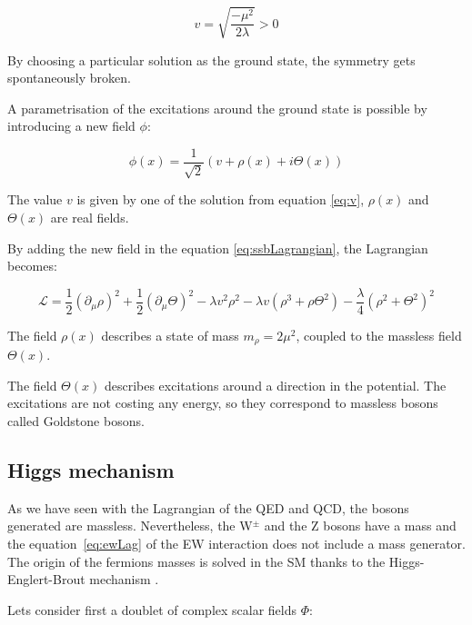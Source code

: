     \begin{equation}
      v = \sqrt{\frac{- \mu^2}{2\lambda}} > 0
      \label{eq:v}
    \end{equation}

    By choosing a particular solution as the ground state, the symmetry gets spontaneously broken.

    A parametrisation of the excitations around the ground state is possible by introducing a new field $\phi$:

    \begin{equation}
      \phi(x) = \frac{1}{\sqrt{2}} \left( v + \rho(x) + i\Theta(x) \right)
    \end{equation}

    The value $v$ is given by one of the solution from equation \ref{eq:v}, $\rho(x)$ and $\Theta(x)$ are real fields.

    By adding the new field in the equation \ref{eq:ssbLagrangian}, the Lagrangian becomes:

    \begin{equation}
      \mathcal{L} = \frac{1}{2} (\partial_{\mu}\rho)^2 + \frac{1}{2}(\partial_{\mu}\Theta)^2 - \lambda v^2 \rho^2 - \lambda v (\rho^3 +\rho \Theta^2) - \frac{\lambda}{4}(\rho^2 + \Theta^2)^2
    \end{equation}

    The field $\rho(x)$ describes a state of mass $m_{\rho} = 2 \mu^2$, coupled to the massless field $\Theta(x)$.

    The field $\Theta(x)$ describes excitations around a direction in the potential.
    The excitations are not costing any energy, so they correspond to massless bosons called Goldstone bosons.


    \subsection{Higgs mechanism}
    \label{sec:higgsMechanism}

    As we have seen with the Lagrangian of the QED and QCD, the bosons generated are massless. Nevertheless, the W$^{\pm}$ and the Z bosons have a mass and the equation~\ref{eq:ewLag} of the EW interaction does not include a mass generator. 
    The origin of the fermions masses is solved in the \gls{SM} thanks to the Higgs-Englert-Brout mechanism \cite{PhysRevLett.13.508}\cite{1964PhRvL..13..321E}.

    Lets consider first a doublet of complex scalar fields $\Phi$:
    
